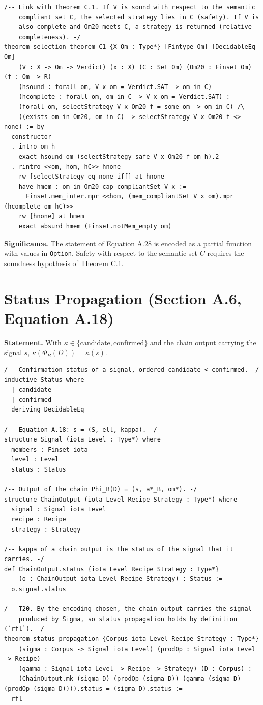 \documentclass[11pt,a4paper]{article}
\begin{document}
\begin{lstlisting}
/-- Link with Theorem C.1. If V is sound with respect to the semantic
    compliant set C, the selected strategy lies in C (safety). If V is
    also complete and Om20 meets C, a strategy is returned (relative
    completeness). -/
theorem selection_theorem_C1 {X Om : Type*} [Fintype Om] [DecidableEq Om]
    (V : X -> Om -> Verdict) (x : X) (C : Set Om) (Om20 : Finset Om) (f : Om -> R)
    (hsound : forall om, V x om = Verdict.SAT -> om in C)
    (hcomplete : forall om, om in C -> V x om = Verdict.SAT) :
    (forall om, selectStrategy V x Om20 f = some om -> om in C) /\
    ((exists om in Om20, om in C) -> selectStrategy V x Om20 f <> none) := by
  constructor
  . intro om h
    exact hsound om (selectStrategy_safe V x Om20 f om h).2
  . rintro <<om, hom, hC>> hnone
    rw [selectStrategy_eq_none_iff] at hnone
    have hmem : om in Om20 cap compliantSet V x :=
      Finset.mem_inter.mpr <<hom, (mem_compliantSet V x om).mpr (hcomplete om hC)>>
    rw [hnone] at hmem
    exact absurd hmem (Finset.notMem_empty om)
\end{lstlisting}

	\noindent\textbf{Significance.} The statement of Equation A.28 is encoded as a partial function with values in \texttt{Option}. Safety with respect to the semantic set $C$ requires the soundness hypothesis of Theorem C.1.

	\section{Status Propagation (Section A.6, Equation A.18)}

	\textbf{Statement.} With $\kappa\in\{\text{candidate},\text{confirmed}\}$ and the chain output carrying the signal $s$, $\kappa(\Phi_B(D))=\kappa(s)$.

\begin{lstlisting}
/-- Confirmation status of a signal, ordered candidate < confirmed. -/
inductive Status where
  | candidate
  | confirmed
  deriving DecidableEq

/-- Equation A.18: s = (S, ell, kappa). -/
structure Signal (iota Level : Type*) where
  members : Finset iota
  level : Level
  status : Status

/-- Output of the chain Phi_B(D) = (s, a*_B, om*). -/
structure ChainOutput (iota Level Recipe Strategy : Type*) where
  signal : Signal iota Level
  recipe : Recipe
  strategy : Strategy

/-- kappa of a chain output is the status of the signal that it carries. -/
def ChainOutput.status {iota Level Recipe Strategy : Type*}
    (o : ChainOutput iota Level Recipe Strategy) : Status :=
  o.signal.status

/-- T20. By the encoding chosen, the chain output carries the signal
    produced by Sigma, so status propagation holds by definition (`rfl`). -/
theorem status_propagation {Corpus iota Level Recipe Strategy : Type*}
    (sigma : Corpus -> Signal iota Level) (prodOp : Signal iota Level -> Recipe)
    (gamma : Signal iota Level -> Recipe -> Strategy) (D : Corpus) :
    (ChainOutput.mk (sigma D) (prodOp (sigma D)) (gamma (sigma D) (prodOp (sigma D)))).status = (sigma D).status :=
  rfl
\end{lstlisting}
\end{document}
